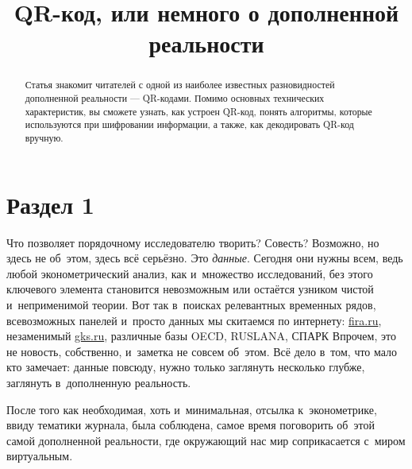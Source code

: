 \documentclass[final,pdftex]{../../template/epsilonj}
\begin{document}
\setcounter{page}{37}
	
	\begin{frontmatter}
		\title{QR-код, или немного о дополненной реальности}
		
		\begin{aug}
			\author{ }%
			
			
			\address{НИУ ВШЭ, Москва.}
		\end{aug}
		
		\begin{abstract}
			Статья знакомит читателей с одной из наиболее известных разновидностей дополненной реальности --- QR-кодами. Помимо основных технических характеристик, вы сможете узнать, как устроен QR-код, понять алгоритмы, которые используются при шифровании информации, а также, как декодировать QR-код вручную. 
		\end{abstract}
		
		\begin{keyword}
		\end{keyword}
		
	\end{frontmatter}
	
	
	\section{Раздел 1}


Что позволяет порядочному исследователю творить? Совесть?  Возможно, но здесь не об~этом, здесь всё серьёзно. Это \textit{данные}. Сегодня они нужны всем, ведь любой эконометрический анализ, как и~множество исследований, без этого ключевого элемента становится невозможным или остаётся узником чистой и~неприменимой теории. Вот так в~поисках релевантных временных рядов, всевозможных панелей и~просто данных мы скитаемся по интернету: \href{http://www.fira.ru}{fira.ru}, незаменимый \href{http://www.gks.ru}{gks.ru}, различные базы OECD, RUSLANA, СПАРК\ldotst{} Впрочем, это не новость, собственно, и~заметка не совсем об~этом. Всё дело в~том, что мало кто замечает: данные повсюду, нужно только заглянуть несколько глубже, заглянуть в~дополненную реальность. 

После того как необходимая, хоть и~минимальная, отсылка к~эконометрике, ввиду тематики журнала, была соблюдена, самое время поговорить об~этой самой дополненной реальности, где окружающий нас мир соприкасается с~миром виртуальным.
\end{document}
